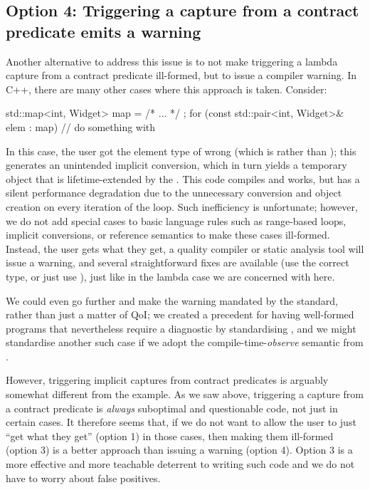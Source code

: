 \subsection*{Option 4: Triggering a capture from a contract predicate emits a warning}

Another alternative to address this issue is to not make triggering a lambda capture from a contract predicate ill-formed, but to issue a compiler warning. In C++, there are many other cases where this approach is taken. Consider:

\begin{codeblock}
std::map<int, Widget> map = { /* ... */ };
for (const std::pair<int, Widget>& elem : map)
  // do something with 
\end{codeblock}

In this case, the user got the element type of  wrong (which is  rather than ); this generates an unintended implicit conversion, which in turn yields a temporary object that is lifetime-extended by the . This code compiles and works, but has a silent performance degradation due to the unnecessary conversion and object creation on every iteration of the loop. Such inefficiency is unfortunate; however, we do not add special cases to basic language rules such as range-based  loops, implicit conversions, or reference semantics to make these cases ill-formed. Instead, the user gets what they get, a quality compiler or static analysis tool will issue a warning, and several straightforward fixes are available (use the correct type, or just use ), just like in the lambda case we are concerned with here.

We could even go further and make the warning mandated by the standard, rather than just a matter of QoI; we created a precedent for having well-formed programs that nevertheless require a diagnostic by standardising , and we might standardise another such case if we adopt the compile-time-\emph{observe} semantic from \cite{P2894R1}.

However, triggering implicit captures from contract predicates is arguably somewhat different from the  example. As we saw above, triggering a capture from a contract predicate is \emph{always} suboptimal and questionable code, not just in certain cases. It therefore seems that, if we do not want to allow the user to just ``get what they get'' (option 1) in those cases, then making them ill-formed (option 3) is a better approach than issuing a warning (option 4). Option 3 is a more effective and more teachable deterrent to writing such code and we do not have to worry about false positives.

